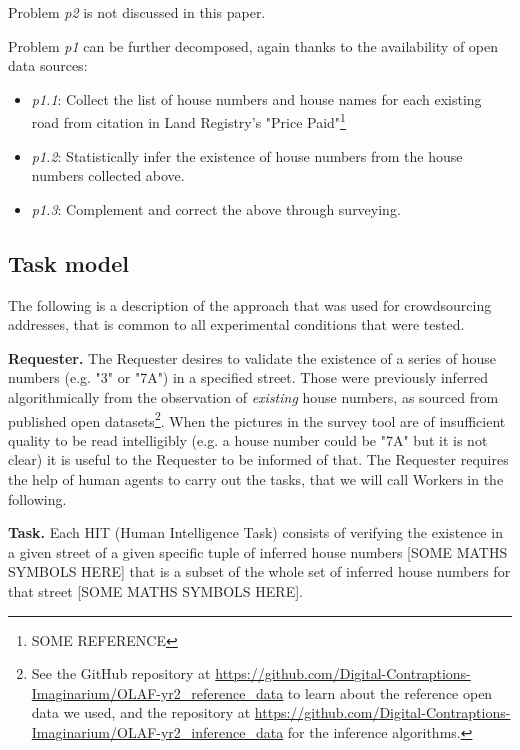     Problem {\it p2} is not discussed in this paper. 
    
    Problem {\it p1} can be further decomposed, again thanks to the availability of open data sources:
    
    \begin{itemize}
        \item {\it p1.1}: Collect the list of house numbers and house names for each existing road from citation in Land Registry's "Price Paid"\footnote{SOME REFERENCE}
        \item {\it p1.2}: Statistically infer the existence of house numbers from the house numbers collected above.
        \item {\it p1.3}: Complement and correct the above through surveying.
    \end{itemize}

\subsection{Task model}

    The following is a description of the approach that was used for crowdsourcing addresses, that is common to all experimental conditions that were tested.
    
    \textbf{Requester.} The Requester desires to validate the existence of a series of house numbers (e.g. "3" or "7A") in a specified street. Those were previously inferred algorithmically from the observation of \textit{existing} house numbers, as sourced from published open datasets\footnote{See the GitHub repository at \url{https://github.com/Digital-Contraptions-Imaginarium/OLAF-yr2_reference_data} to learn about the reference open data we used, and the repository at \url{https://github.com/Digital-Contraptions-Imaginarium/OLAF-yr2_inference_data} for the inference algorithms.}. When the pictures in the survey tool are of insufficient quality to be read intelligibly (e.g. a house number could be "7A" but it is not clear) it is useful to the Requester to be informed of that. The Requester requires the help of human agents to carry out the tasks, that we will call Workers in the following.
    
    \textbf{Task.} Each HIT (Human Intelligence Task) consists of verifying the existence in a given street of a given specific tuple of inferred house numbers {[}SOME MATHS SYMBOLS HERE{]} that is a subset of the whole set of inferred house numbers for that street {[}SOME MATHS SYMBOLS HERE{]}. 
    
